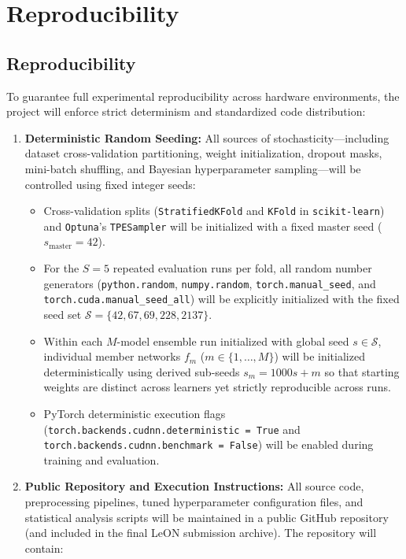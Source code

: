 \documentclass[11pt, a4paper]{article}
\begin{document}
\section{Reproducibility}

\subsection{Reproducibility}
To guarantee full experimental reproducibility across hardware environments, the project will enforce strict determinism and standardized code distribution:

\begin{enumerate}
    \item \textbf{Deterministic Random Seeding:} All sources of stochasticity—including dataset cross-validation partitioning, weight initialization, dropout masks, mini-batch shuffling, and Bayesian hyperparameter sampling—will be controlled using fixed integer seeds:
    \begin{itemize}
        \item Cross-validation splits (\texttt{StratifiedKFold} and \texttt{KFold} in \texttt{scikit-learn}) and \texttt{Optuna}'s \texttt{TPESampler} will be initialized with a fixed master seed ($s_{\text{master}} = 42$).
        \item For the $S = 5$ repeated evaluation runs per fold, all random number generators (\texttt{python.random}, \texttt{numpy.random}, \texttt{torch.manual\_seed}, and \texttt{torch.cuda.manual\_seed\_all}) will be explicitly initialized with the fixed seed set $\mathcal{S} = \{42, 67, 69, 228, 2137\}$.
        \item Within each $M$-model ensemble run initialized with global seed $s \in \mathcal{S}$, individual member networks $f_m$ ($m \in \{1, \dots, M\}$) will be initialized deterministically using derived sub-seeds $s_m = 1000 s + m$ so that starting weights are distinct across learners yet strictly reproducible across runs.
        \item PyTorch deterministic execution flags (\texttt{torch.backends.cudnn.deterministic = True} and \texttt{torch.backends.cudnn.benchmark = False}) will be enabled during training and evaluation.
    \end{itemize}
    \item \textbf{Public Repository and Execution Instructions:} All source code, preprocessing pipelines, tuned hyperparameter configuration files, and statistical analysis scripts will be maintained in a public GitHub repository (and included in the final LeON submission archive). The repository will contain:

\end{enumerate}
\end{document}
